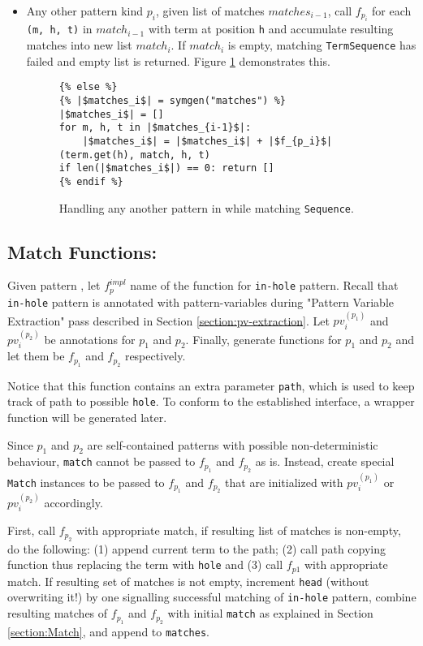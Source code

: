 \begin{itemize}
\item Any other pattern kind $p_i$, given list of matches $matches_{i-1}$, call $f_{p_i}$ for each \texttt{(m, h, t)} in $match_{i-1}$ with term at position \texttt{h} and accumulate resulting matches into new list $match_{i}$. If $match_{i}$ is empty, matching \texttt{TermSequence} has failed and empty list is returned. Figure \ref{codegen-pattern-seq-3} demonstrates this.

\begin{figure}[htb]
\begin{verbatim}
{% else %}
{% |$matches_i$| = symgen("matches") %}
|$matches_i$| = []
for m, h, t in |$matches_{i-1}$|:
	|$matches_i$| = |$matches_i$| + |$f_{p_i}$|(term.get(h), match, h, t)
if len(|$matches_i$|) == 0: return []
{% endif %}
\end{verbatim}
\caption{Handling any another pattern in \PatternSequenceNoArg \space while matching \texttt{Sequence}.}
\label{codegen-pattern-seq-3}
\end{figure}
\end{itemize}

\subsection{Match Functions: \PatternInHoleNoArg}
Given pattern \PatternInHole, let $f_p^{impl}$ name of the function for \texttt{in-hole} pattern. Recall that \texttt{in-hole} pattern is annotated with pattern-variables during "Pattern Variable Extraction" pass described in Section \ref{section:pv-extraction}. Let $pv_i^{(p_1)}$ and $pv_i^{(p_2)}$ be annotations for $p_1$ and $p_2$. Finally, generate functions for $p_1$ and $p_2$ and let them be $f_{p_1}$ and $f_{p_2}$ respectively. 

Notice that this function contains an extra parameter \texttt{path}, which is used to keep track of path to possible \texttt{hole}. To conform to the established interface, a wrapper function will be generated later.

Since $p_1$ and $p_2$ are self-contained patterns with possible non-deterministic behaviour, \texttt{match} cannot be passed to $f_{p_1}$ and $f_{p_2}$ as is. Instead, create special \texttt{Match} instances to be passed to $f_{p_1}$ and $f_{p_2}$ that are initialized with $pv_i^{(p_1)}$ or $pv_i^{(p_2)}$ accordingly.

First, call $f_{p_2}$ with appropriate match, if resulting list of matches is non-empty, do the following: (1) append current term to the path; (2) call path copying function thus replacing the term with \texttt{hole} and (3) call $f_{p1}$ with appropriate match. If resulting set of matches is not empty, increment \texttt{head} (without overwriting it!) by one signalling successful matching of \texttt{in-hole} pattern, combine resulting matches of $f_{p_1}$ and $f_{p_2}$ with initial \texttt{match} as explained in Section \ref{section:Match}, and append to \texttt{matches}.

